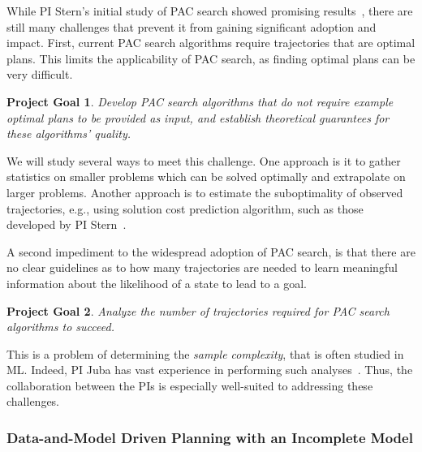 \documentclass[12pt]{article}
\newtheorem{problem}{Project Goal}
\begin{document}

While PI Stern's initial study of PAC search showed promising results~\cite{stern2011probably,stern2012search}, there are still many challenges that prevent it from gaining significant adoption and impact. First, current PAC search algorithms require trajectories that are optimal plans. This limits the applicability of PAC search, as finding optimal plans can be very difficult. 
\begin{problem}
Develop PAC search algorithms that do not require example optimal plans to be provided as input, and establish theoretical guarantees for these algorithms' quality.
\end{problem}
We will study several ways to meet this challenge. One approach is it to gather statistics on smaller problems which can be solved optimally and extrapolate on larger problems. Another approach is to estimate the suboptimality of observed trajectories, e.g., using solution cost prediction algorithm, such as those developed by PI Stern~\cite{lelis2016predicting,lelis2011predicting}. 



A second impediment to the widespread adoption of PAC search, is that there are no clear guidelines as to how many trajectories are needed to learn meaningful information about the likelihood of a state to lead to a goal. 
\begin{problem}
Analyze the number of trajectories required for PAC search algorithms to succeed.
\end{problem}
This is a problem of determining the {\em sample complexity}, that is often studied in ML. Indeed, PI Juba has vast experience in performing such analyses~\cite{goldreich2012theory,juba2013ijcai,juba2016jmlr,juba2016aaai,zhang2017aaai}. Thus, the collaboration between the PIs is especially well-suited to addressing these challenges. 






\subsubsection{Data-and-Model Driven Planning with an Incomplete Model}
\end{document}
